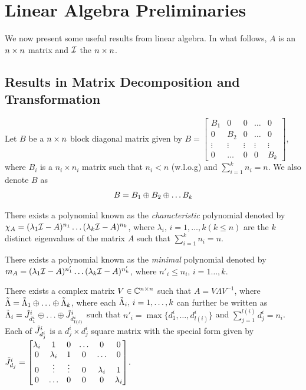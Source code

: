 \section{Linear Algebra Preliminaries}


We now present some useful results from linear algebra. In what follows, $A$ is an $n\times n$ matrix and $\mathcal{I}$ the $n\times n$.
\subsection{Results in Matrix Decomposition and Transformation}
Let $B$ be a $n\times n$ block diagonal matrix given by $B=\begin{bmatrix} B_1 &0 &0 &\ldots &0 \\ 0 &B_2 &0 &\ldots &0  \\ \vdots &\vdots &\vdots &\vdots &\vdots \\ 0 &\ldots &0 &0 &B_k \end{bmatrix}$, where $B_i$ is a $n_i \times n_i$ matrix such that $n_i<n$ (w.l.o.g) and $\sum_{i=1}^k n_i=n$. We also denote $B$ as
\begin{align*}
B=B_1 \oplus B_2 \oplus \ldots B_k
\end{align*}
\begin{lemma}
There exists a polynomial known as the \emph{characteristic} polynomial denoted by $\chi_A=(\lambda_1 \mathcal{I}-A)^{n_1}\ldots(\lambda_{k} \mathcal{I}-A)^{n_k}$, where $\lambda_i,\,i=1,\ldots,k (k\leq n)$ are the $k$ distinct eigenvalues of the matrix $A$ such that $\sum_{i=1}^k n_i=n$.
\end{lemma}
\begin{lemma}
There exists a polynomial known as the \emph{minimal} polynomial denoted by $m_A=(\lambda_1 \mathcal{I}-A)^{n'_1}\ldots(\lambda_k \mathcal{I}-A)^{n'_k}$, where $n'_i\leq n_i,\,i=1\ldots,k$.
\end{lemma}
\begin{lemma}
There exists a complex matrix $V\in \mathbb{C}^{n\times n}$ such that $A=V\Lambda V^{-1}$, where
$\tilde{\Lambda}=\tilde{\Lambda}_1\oplus\ldots\oplus\tilde{\Lambda}_k$, where each $\tilde{\Lambda}_i,\,i=1,\ldots,k$ can further be written as $\tilde{\Lambda}_i= {\tilde{J}}^i_{d^i_1}\oplus \ldots \oplus {\tilde{J}}^i_{d^i_{l(i)}}$
such that  $n'_i=\max\{d^i_1,\ldots, d^i_{l(i)} \}$ and $\sum_{j=1}^{l(i)} d^i_j =n_i$. Each of ${\tilde{J}}^i_{d^i_j}$ is a $d^i_j\times d^i_j$ square matrix with the special form given by
${\tilde{J}}^i_{d_j}=\begin{bmatrix} \lambda_i &1 &0 &\ldots &0 &0\\ 0 &\lambda_i &1 &0 &\ldots &0 \\ 0 &\vdots &\vdots &0 &\lambda_i &1 \\ 0 &\ldots &0 &0 &0 &\lambda_i \end{bmatrix}$.
\end{lemma}

